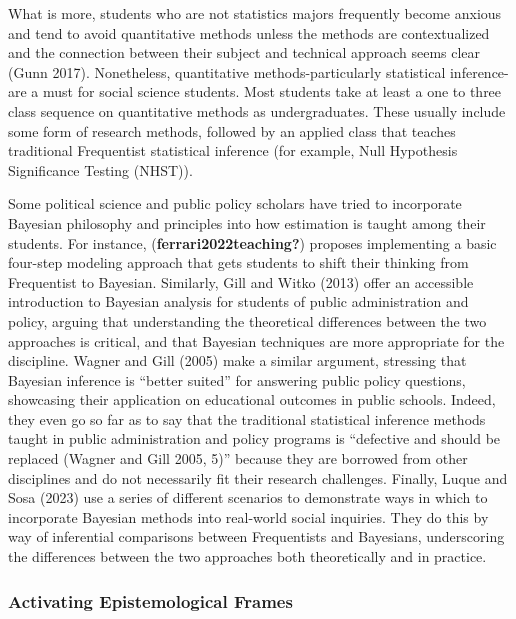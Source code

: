\documentclass[
  12pt,
  letterpaper,
  DIV=11,
  numbers=noendperiod]{scrartcl}
\begin{document}
What is more, students who are not statistics majors frequently become
anxious and tend to avoid quantitative methods unless the methods are
contextualized and the connection between their subject and technical
approach seems clear (Gunn 2017). Nonetheless, quantitative
methods-particularly statistical inference-are a must for social science
students. Most students take at least a one to three class sequence on
quantitative methods as undergraduates. These usually include some form
of research methods, followed by an applied class that teaches
traditional Frequentist statistical inference (for example, Null
Hypothesis Significance Testing (NHST)).

Some political science and public policy scholars have tried to
incorporate Bayesian philosophy and principles into how estimation is
taught among their students. For instance,
(\textbf{ferrari2022teaching?}) proposes implementing a basic four-step
modeling approach that gets students to shift their thinking from
Frequentist to Bayesian. Similarly, Gill and Witko (2013) offer an
accessible introduction to Bayesian analysis for students of public
administration and policy, arguing that understanding the theoretical
differences between the two approaches is critical, and that Bayesian
techniques are more appropriate for the discipline. Wagner and Gill
(2005) make a similar argument, stressing that Bayesian inference is
``better suited'' for answering public policy questions, showcasing
their application on educational outcomes in public schools. Indeed,
they even go so far as to say that the traditional statistical inference
methods taught in public administration and policy programs is
``defective and should be replaced (Wagner and Gill 2005, 5)'' because
they are borrowed from other disciplines and do not necessarily fit
their research challenges. Finally, Luque and Sosa (2023) use a series
of different scenarios to demonstrate ways in which to incorporate
Bayesian methods into real-world social inquiries. They do this by way
of inferential comparisons between Frequentists and Bayesians,
underscoring the differences between the two approaches both
theoretically and in practice.

\hypertarget{activating-epistemological-frames}{%
\subsubsection{Activating Epistemological
Frames}\label{activating-epistemological-frames}}
\end{document}
